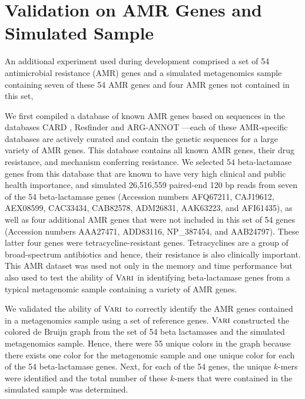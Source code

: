 \documentclass{article}
\def\ours{\mbox{\rm {\sc Vari}}}
\def \citep #1{\cite{#1}}
\begin{document}
\section{Validation on AMR Genes and Simulated Sample}
An additional experiment used during development comprised a set of 54 antimicrobial resistance (AMR) genes and a simulated metagenomics sample containing seven of these 54 AMR genes and four AMR genes not contained in this set,

We first compiled a database of known AMR genes based on sequences in the databases CARD \citep{mcarthur}, Resfinder \citep{zankari} and ARG-ANNOT \citep{gupta}---each of these AMR-specific databases are actively curated and contain the genetic sequences for a large variety of AMR genes.  This database contains all known AMR genes, their drug resistance, and mechanism conferring resistance.  We selected 54 beta-lactamase genes from this database that are known to have very high clinical and public health importance, and simulated 26,516,559 paired-end 120 bp reads from seven of the 54 beta-lactamase genes (Accession numbers AFQ67211, CAJ19612, AEX08599, CAC33434, CAB82578, ADM26831, AAK63223, and AFI61435), as well as four additional AMR genes that were not included in this set of 54 genes (Accession numbers AAA27471, ADD83116, NP\_387454, and AAB24797).  These latter four genes were tetracycline-resistant genes.  Tetracyclines are a group of broad-spectrum antibiotics and hence, their resistance is also clinically important.   This AMR dataset was used not only in the memory and time performance but also used to test the ability of $\ours$ in identifying beta-lactamase genes from a typical metagenomic sample containing a variety of AMR genes.  %


We validated the ability of $\ours$ to correctly identify the AMR genes contained in a metagenomics sample using a set of reference genes. $\ours$ constructed the colored de Bruijn graph from the set of 54 beta lactamases and the simulated metagenomics sample. Hence, there were 55 unique colors in the graph because there exists one color for the metagenomic sample and one unique color for each of the 54 beta-lactamase genes.  Next, for each of the 54 genes, the unique $k$-mers were identified and the total number of these $k$-mers that were contained in the simulated sample was determined.  
\end{document}
